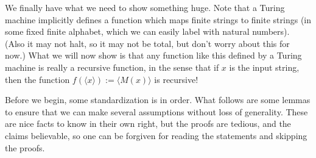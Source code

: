 \documentclass{article}
\theoremstyle{definition}
\theoremstyle{plain}
\theoremstyle{theorem}
\begin{document}
\par We finally have what we need to show something huge. Note that a Turing machine implicitly defines a function which maps finite strings to finite strings (in some fixed finite alphabet, which we can easily label with natural numbers). (Also it may not halt, so it may not be total, but don't worry about this for now.) What we will now show is that any function like this defined by a Turing machine is really a recursive function, in the sense that if $x$ is the input string, then the function $f(\langle x \rangle) := \langle M(x) \rangle$ is recursive!
\par Before we begin, some standardization is in order. What follows are some lemmas to ensure that we can make several assumptions without loss of generality. These are nice facts to know in their own right, but the proofs are tedious, and the claims believable, so one can be forgiven for reading the statements and skipping the proofs. 
\end{document}
